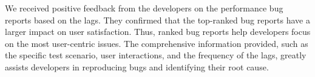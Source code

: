 


We received positive feedback from the developers on the performance bug reports based on the lags. They confirmed that the top-ranked bug reports have a larger impact on user satisfaction. Thus, ranked bug reports help developers focus on the most user-centric issues. The comprehensive information provided, such as the specific test scenario, user interactions, and the frequency of the lags, greatly assists developers in reproducing bugs and identifying their root cause.



